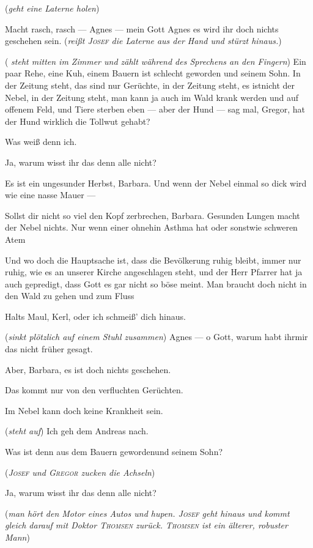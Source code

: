 \documentclass[
	final,
	a4paper,
	ngerman,
	mpinclude = true, %
	twoside = true,
	open = right,
	cleardoublepage = plain,
	DIV = 13,
	BCOR = 1cm,
	titlepage = firstiscover,
	]{scrbook}
\newcommand{\direction}[1]{(\textit{#1})}
\newcommand{\thecharacter}[1]{\textup{\textsc{#1}}\xspace}
\newcommand{\theBarbara}{\thecharacter{Barbara}}
\newcommand{\theJosef}{\thecharacter{Josef}}
\newcommand{\theGregor}{\thecharacter{Gregor}}
\newcommand{\theJan}{\thecharacter{Jan}}
\newcommand{\theAndreas}{\thecharacter{Andreas}}
\newcommand{\theLuise}{\thecharacter{Luise}}
\newcommand{\theThomsen}{\thecharacter{Thomsen}}
\newcommand{\character}[1]{\item[#1]}
\newcommand{\Barbara}{\character{\theBarbara}}
\newcommand{\Josef}{\character{\theJosef}}
\newcommand{\Gregor}{\character{\theGregor}}
\newcommand{\Jan}{\character{\theJan}}
\newcommand{\Andreas}{\character{\theAndreas}}
\newcommand{\Luise}{\character{\theLuise}}
\begin{document}
\begin{play}
\Josef
\direction{geht eine Laterne holen}

\Andreas
Macht rasch, rasch --- Agnes --- mein Gott Agnes es wird ihr doch nichts geschehen sein. \direction{reißt \theJosef die Laterne aus der Hand und stürzt hinaus.}

\Barbara
\direction{ steht mitten im Zimmer und zählt während des Sprechens an den Fingern}
Ein paar Rehe, eine Kuh, einem Bauern ist schlecht geworden und seinem Sohn. In der Zeitung steht, das sind nur Gerüchte, in der Zeitung steht, es istnicht der Nebel, in der Zeitung steht, man kann ja auch im Wald krank werden und auf offenem Feld, und Tiere sterben eben --- aber der Hund --- sag mal, Gregor, hat der Hund wirklich die Tollwut gehabt?

\Gregor
Was weiß denn ich.

\Barbara
Ja, warum wisst ihr das denn alle nicht?

\Luise
Es ist ein ungesunder Herbst, Barbara. Und wenn der Nebel einmal so dick wird wie eine nasse Mauer ---

\Josef
Sollst dir nicht so viel den Kopf zerbrechen, Barbara. Gesunden Lungen macht der Nebel nichts. Nur wenn einer ohnehin Asthma hat oder sonstwie schweren Atem

\Jan
Und wo doch die Hauptsache ist, dass die Bevölkerung ruhig bleibt, immer nur ruhig, wie es an unserer Kirche angeschlagen steht, und der Herr Pfarrer hat ja auch gepredigt, dass Gott es gar nicht so böse meint. Man braucht doch nicht in den Wald zu gehen und zum Fluss

\Josef
Halts Maul, Kerl, oder ich schmeiß' dich hinaus.

\Barbara
\direction{sinkt plötzlich auf einem Stuhl zusammen} Agnes --- o Gott, warum habt ihrmir das nicht früher gesagt.

\Luise
Aber, Barbara, es ist doch nichts geschehen.

\Josef
Das kommt nur von den verfluchten Gerüchten.

\Gregor
Im Nebel kann doch keine Krankheit sein.

\Jan
\direction{steht auf} Ich geh dem Andreas nach.

\Barbara
Was ist denn aus dem Bauern gewordenund seinem Sohn?

\direction{\theJosef und \theGregor zucken die Achseln}

\Barbara
Ja, warum wisst ihr das denn alle nicht?

\direction{man hört den Motor eines Autos und hupen. \theJosef geht hinaus und kommt gleich darauf mit Doktor \theThomsen zurück. \theThomsen ist ein älterer, robuster Mann}


\end{play}
\end{document}
